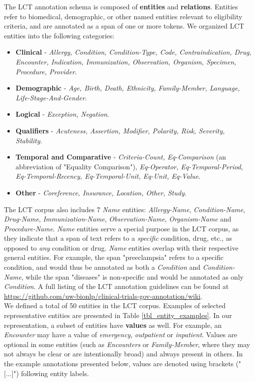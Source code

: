 \documentclass[fleqn,10pt]{wlscirep}
\begin{document}
\noindent The LCT annotation schema is composed of \textbf{entities} and 
\textbf{relations}. Entities refer to biomedical, demographic, or other named entities relevant to eligibility criteria, and are annotated as a span of one or more tokens. We organized LCT entities into the following categories:
\begin{itemize}
    \item \textbf{Clinical} - \textit{Allergy, Condition, Condition-Type, Code, Contraindication, Drug, Encounter, Indication, Immunization, Observation, Organism, Specimen, Procedure, Provider}. %
    \item \textbf{Demographic} - \textit{Age, Birth, Death, Ethnicity, Family-Member, Language, Life-Stage-And-Gender}. %
    \item \textbf{Logical} - \textit{Exception, Negation}. %
    \item \textbf{Qualifiers} - \textit{Acuteness, Assertion, Modifier, Polarity, Risk, Severity, Stability}. %
    \item \textbf{Temporal and Comparative} - \textit{Criteria-Count, Eq-Comparison} (an abbreviation of "Equality Comparison"), \textit{Eq-Operator, Eq-Temporal-Period, Eq-Temporal-Recency, Eq-Temporal-Unit, Eq-Unit, Eq-Value}. %
    \item \textbf{Other} - \textit{Coreference, Insurance, Location, Other, Study}. %
\end{itemize}

\noindent The LCT corpus also includes 7 \textit{Name} entities: \textit{Allergy-Name}, \textit{Condition-Name}, \textit{Drug-Name}, \textit{Immunization-Name}, \textit{Observation-Name}, \textit{Organism-Name} and \textit{Procedure-Name}. \textit{Name} entities serve a special purpose in the LCT corpus, as they indicate that a span of text refers to a \textit{specific} condition, drug, etc., as opposed to \textit{any} condition or drug. \textit{Name} entities overlap with their respective general entities. For example, the span "preeclampsia" refers to a specific condition, and would thus be annotated as both a \textit{Condition} and \textit{Condition-Name}, while the span "diseases" is non-specific and would be annotated as only \textit{Condition}. A full listing of the LCT annotation guidelines can be found at \url{https://github.com/uw-bionlp/clinical-trials-gov-annotation/wiki}. \\

\noindent We defined a total of 50 entities in the LCT corpus. Examples of selected representative entities are presented in Table \ref{tbl_entity_examples}. In our representation, a subset of entities have \textbf{values} as well. For example, an \textit{Encounter} may have a value of \textit{emergency}, \textit{outpatient} or \textit{inpatient}. Values are optional in some entities (such as \textit{Encounters} or \textit{Family-Member}, where they may not always be clear or are intentionally broad) and always present in others. In the example annotations presented below, values are denoted using brackets ("[...]") following entity labels. \\
\end{document}
